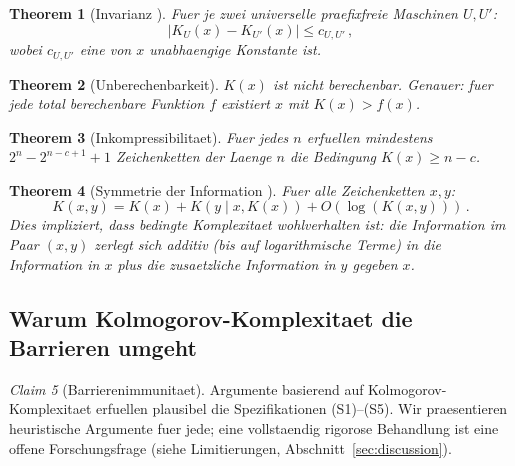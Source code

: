 \documentclass[aps,prd,twocolumn,superscriptaddress,nofootinbib]{revtex4-2}
\newtheorem{theorem}{Theorem}[section]
\theoremstyle{definition}
\theoremstyle{remark}
\newtheorem{claim}[theorem]{Claim}
\begin{document}
\begin{theorem}[Invarianz {\cite{Kolmogorov1965,Solomonoff1964,Chaitin1966}}]
\label{thm:invariance}
Fuer je zwei universelle praefixfreie Maschinen $U, U'$:
\begin{equation}
|K_U(x) - K_{U'}(x)| \leq c_{U,U'}\,,
\end{equation}
wobei $c_{U,U'}$ eine von $x$ unabhaengige Konstante ist.
\end{theorem}

\begin{theorem}[Unberechenbarkeit]
\label{thm:incomputable}
$K(x)$ ist nicht berechenbar. Genauer: fuer jede total berechenbare Funktion $f$ existiert $x$ mit $K(x) > f(x)$.
\end{theorem}

\begin{theorem}[Inkompressibilitaet]
\label{thm:incompressible}
Fuer jedes $n$ erfuellen mindestens $2^n - 2^{n-c+1} + 1$ Zeichenketten der Laenge $n$ die Bedingung $K(x) \geq n - c$.
\end{theorem}

\begin{theorem}[Symmetrie der Information {\cite{LiVitanyi2008}}]
\label{thm:symmetry}
Fuer alle Zeichenketten $x, y$:
\begin{equation}
K(x, y) = K(x) + K(y \mid x, K(x)) + O(\log(K(x, y)))\,.
\end{equation}
Dies impliziert, dass bedingte Komplexitaet wohlverhalten ist: die Information im Paar $(x, y)$ zerlegt sich additiv (bis auf logarithmische Terme) in die Information in $x$ plus die zusaetzliche Information in $y$ gegeben $x$.
\end{theorem}

\subsection{Warum Kolmogorov-Komplexitaet die Barrieren umgeht}

\begin{claim}[Barrierenimmunitaet]
\label{claim:barrier_immune}
Argumente basierend auf Kolmogorov-Komplexitaet erfuellen plausibel die Spezifikationen (S1)--(S5). Wir praesentieren heuristische Argumente fuer jede; eine vollstaendig rigorose Behandlung ist eine offene Forschungsfrage (siehe Limitierungen, Abschnitt~\ref{sec:discussion}).
\end{claim}
\end{document}
